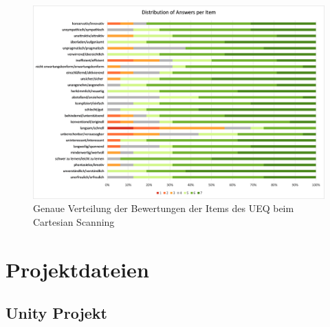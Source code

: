 \begin{figure}[tbh]
    \centering
    \includegraphics[scale=0.75]{images/Results/UEQ-VerteilungDerItems-CartesianScanning.png}
    \caption{Genaue Verteilung der Bewertungen der Items des UEQ beim Cartesian Scanning}
    \label{fig:ueqItemVerteilungCartesian}
\end{figure}

\cleardoublepage

\chapter{Projektdateien}

\section{Unity Projekt}
\label{Anhang:Projekt}

\cleardoublepage

